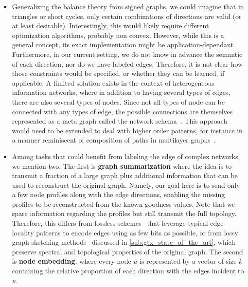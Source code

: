 \begin{itemize}[leftmargin=*]
  \item Generalizing the balance theory from signed graphs, we could imagine that in triangles or
    short cycles, only certain combinations of directions are valid (or at least desirable).
    Interestingly, this would likely require different optimization algorithms, probably non convex.
    However, while this is a general concept, its exact implementation might be
    application-dependant. Furthermore, in our current setting, we do not know in advance the
    semantic of each direction, nor do we have labeled edges. Therefore, it is not clear how those
    constraints would be specified, or whether they can be learned, if applicable. A limited solution
    exists in the context of heterogeneous information networks, where in addition to having several
    types of edges, there are also several types of nodes. Since not all types of node can be
    connected with any types of edge, the possible connections are themselves represented as a meta
    graph called the network schema~\autocite[Definition 3]{HINSurvey17}. This approach would need
    to be extended to deal with higher order patterns, for instance in a manner reminiscent of
    composition of paths in multilayer graphs~\autocites{metapath11}[Section
    4.2]{KnowledgeGraphSurvey17}.

  \item Among tasks that could benefit from labeling the edge of complex networks, we mention two.
    The first is \textbf{graph summarization} where the idea is to transmit a fraction of a large
    graph plus additional information that can be used to reconstruct the original graph. Namely,
    our goal here is to send only a few node profiles along with the edge directions, enabling the
    missing profiles to be reconstructed from the known goodness values. Note that we spare
    information regarding the profiles but still transmit the full topology. Therefore, this differs
    from lossless schemes~\autocites{compressSN09}{compressSN12} that leverage typical edge locality
    patterns to encode edges using as few bits as possible, or from lossy graph sketching
    methods~\autocite{graphSketch12} discussed in \autoref{sub:gtx_state_of_the_art}, which preserve
    spectral and topological properties of the original graph.
    The second is \textbf{node embedding}, where every node $u$ is represented by a vector of size
    $k$ containing the relative proportion of each direction with the edges incident to $u$.
\end{itemize}

